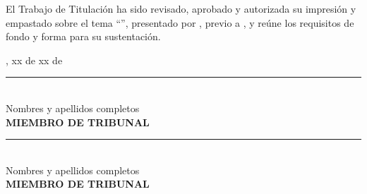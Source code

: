 
El Trabajo de Titulación ha sido revisado, aprobado y autorizada su impresión y empastado sobre el tema ``\UTITituloProyectoMayusculas'', presentado por \UTIAutoresTexto, previo a \UTIFraseObtencionTituloProfesional{}, y reúne los requisitos de fondo y forma para su sustentación.

\vspace{1.5cm}
\UTICiudadPais, xx de xx de \UTIAnio
\vspace{2.5cm}

\begin{center}
\rule{7cm}{0.4pt}\\
Nombres y apellidos completos\\
\textbf{MIEMBRO DE TRIBUNAL}
\end{center}

\vspace{2cm} 

\begin{center}
\rule{7cm}{0.4pt}\\
Nombres y apellidos completos\\
\textbf{MIEMBRO DE TRIBUNAL}
\end{center}